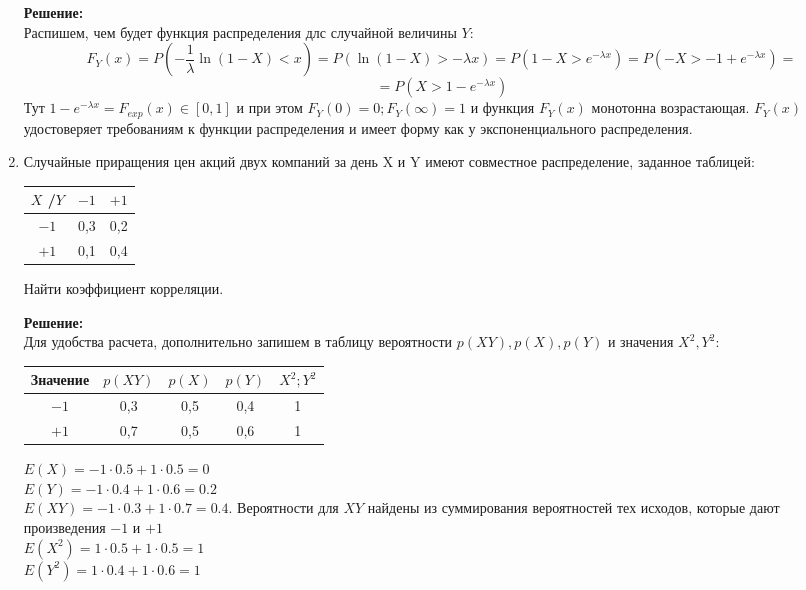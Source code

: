 \documentclass[a4paper,12pt]{article}
\begin{document}
\begin{enumerate}
\textbf{Решение:}\\
Распишем, чем будет функция распределения длс случайной величины $Y$:
$$F_Y(x) = P(-\frac{1}{\lambda}\ln{(1-X)}<x) = P(\ln{(1-X) > -\lambda x})= P(1-X > e^{-\lambda x})=P(-X >-1+e^{-\lambda x})=$$
$$=P(X >1-e^{-\lambda x})$$
Тут $1-e^{-\lambda x} = F_{exp}(x) \in [0,1]$ и при этом $F_Y(0)=0; F_Y(\infty)=1$ и функция $F_Y(x)$ монотонна возрастающая. $F_Y(x)$ удостоверяет требованиям к функции распределения и имеет форму как у экспоненциального распределения.



\item	 Случайные приращения цен акций двух компаний за день X и Y имеют совместное распределение, заданное таблицей:
\begin{center}
 \begin{tabular}{|c| c| c |} 
 \hline
 $X$ \slash $Y$ & $-1$& $+1$ \\ [0.5ex] 
 \hline
 $-1$ & 0,3 & 0,2 \\ 
 \hline
 $+1$ & 0,1	 & 0,4  \\ 
 \hline
\end{tabular}
\end{center}

Найти коэффициент корреляции.

\textbf{Решение:}\\

Для удобства расчета, дополнительно запишем в таблицу вероятности $p(XY), p(X), p(Y)$ и значения $X^2, Y^2$:

\begin{center}
 \begin{tabular}{|c|c|c| c| c |} 
 \hline
 Значение & $p(XY)$& $p(X)$& $p(Y)$&$X^2; Y^2$ \\ [0.5ex] 
 \hline
 $-1$ & 0,3 & 0,5&0,4&1 \\ 
 \hline
 $+1$ & 0,7	 & 0,5&0,6&1  \\ 
 \hline
\end{tabular}
\end{center}
$E(X) = -1 \cdot 0.5 + 1\cdot 0.5=0$\\
$E(Y) = -1 \cdot 0.4 + 1\cdot 0.6=0.2$\\
$E(XY) = -1 \cdot 0.3 + 1\cdot 0.7=0.4$. Вероятности для $XY$ найдены из суммирования вероятностей тех исходов, которые дают произведения $-1$ и $+1$\\
$E(X^2) = 1 \cdot 0.5 + 1\cdot 0.5=1$\\
$E(Y^2) = 1 \cdot 0.4 + 1\cdot 0.6=1$\\


\end{enumerate}
\end{document}
